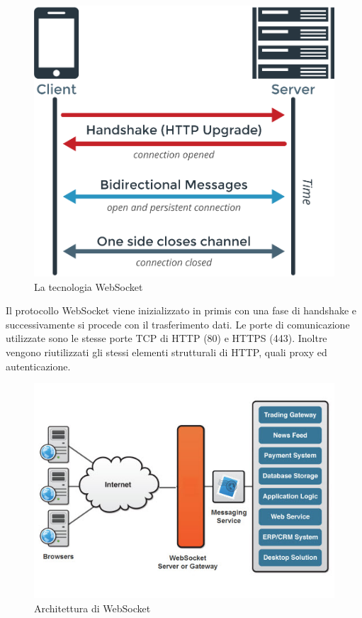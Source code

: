 \documentclass[11pt]{article}
\begin{document}
\begin{figure}[H]
	\centering
	\includegraphics[scale=0.25]{images/websocket.png}
	\caption{La tecnologia WebSocket}
	\label{websocket}
\end{figure}

Il protocollo WebSocket viene inizializzato in primis con una fase di handshake e successivamente si procede con il trasferimento dati. Le porte di comunicazione utilizzate sono le stesse porte TCP di HTTP (80) e HTTPS (443). Inoltre vengono riutilizzati gli stessi elementi strutturali di HTTP, quali proxy ed autenticazione.

\begin{figure}[H]
	\centering
	\includegraphics[scale=1.00]{images/websocket-architecture.jpg}
	\caption{Architettura di WebSocket}
	\label{websocket-architecture}
\end{figure}
\end{document}
